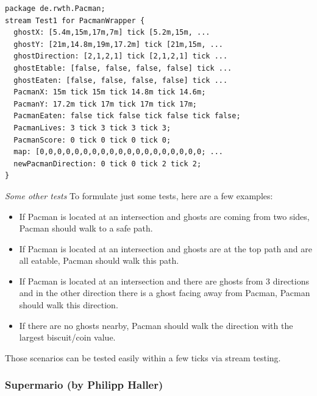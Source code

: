 \begin{lstlisting}[caption={Stream test for the scenario above},label=lst:pmStreamTest]
package de.rwth.Pacman;
stream Test1 for PacmanWrapper {
  ghostX: [5.4m,15m,17m,7m] tick [5.2m,15m, ...
  ghostY: [21m,14.8m,19m,17.2m] tick [21m,15m, ...
  ghostDirection: [2,1,2,1] tick [2,1,2,1] tick ...
  ghostEtable: [false, false, false, false] tick ...
  ghostEaten: [false, false, false, false] tick ...
  PacmanX: 15m tick 15m tick 14.8m tick 14.6m;
  PacmanY: 17.2m tick 17m tick 17m tick 17m;
  PacmanEaten: false tick false tick false tick false;
  PacmanLives: 3 tick 3 tick 3 tick 3;
  PacmanScore: 0 tick 0 tick 0 tick 0;
  map: [0,0,0,0,0,0,0,0,0,0,0,0,0,0,0,0,0,0,0; ...
  newPacmanDirection: 0 tick 0 tick 2 tick 2;
}
\end{lstlisting}
\emph{Some other tests}\newline
To formulate just some tests, here are a few examples:
\begin{itemize}
	\item If Pacman is located at an intersection and ghosts are coming from two sides, Pacman should walk to a safe path.
	\item If Pacman is located at an intersection and ghosts are at the top path and are all eatable, Pacman should walk this path.
	\item If Pacman is located at an intersection and there are ghosts from 3 directions and in the other direction there is a ghost facing away from Pacman, Pacman should walk this direction.
	\item If there are no ghosts nearby, Pacman should walk the direction with the largest biscuit/coin value.
\end{itemize}

Those scenarios can be tested easily within a few ticks via stream testing.

\subsubsection{Supermario (by Philipp Haller)}


